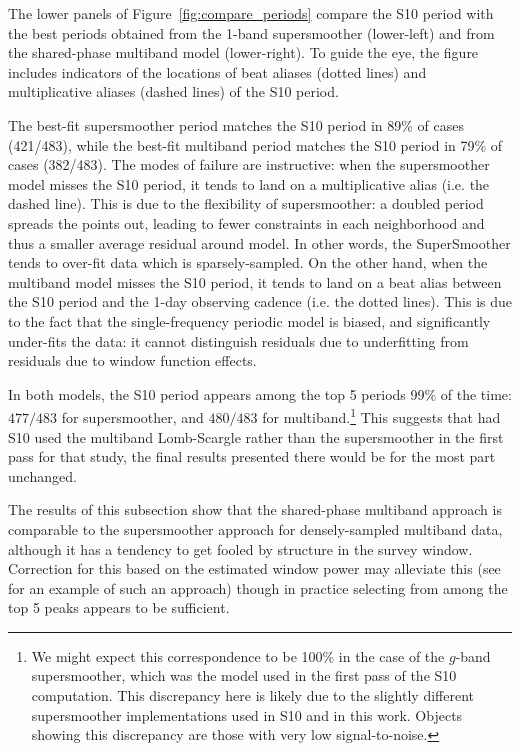 \documentclass{emulateapj}
\newcommand{\Fig}[1]{Figure~\ref{fig:#1}}
\newcommand{\fig}[1]{\Fig{#1}}
\begin{document}
The lower panels of \fig{compare_periods} compare the S10 period with the best periods obtained from the 1-band supersmoother (lower-left) and from the shared-phase multiband model (lower-right). To guide the eye, the figure includes indicators of the locations of beat aliases (dotted lines) and multiplicative aliases (dashed lines) of the S10 period.

The best-fit supersmoother period matches the S10 period in 89\% of cases (421/483), while the best-fit multiband period matches the S10 period in 79\% of cases (382/483). The modes of failure are instructive: when the supersmoother model misses the S10 period, it tends to land on a multiplicative alias (i.e. the dashed line). This is due to the flexibility of supersmoother: a doubled period spreads the points out, leading to fewer constraints in each neighborhood and thus a smaller average residual around model. In other words, the SuperSmoother tends to over-fit data which is sparsely-sampled. On the other hand, when the multiband model misses the S10 period, it tends to land on a beat alias between the S10 period and the 1-day observing cadence (i.e. the dotted lines). This is due to the fact that the single-frequency periodic model is biased, and significantly under-fits the data: it cannot distinguish residuals due to underfitting from residuals due to window function effects.

In both models, the S10 period appears among the top 5 periods 99\% of the time: $477/483$ for supersmoother, and $480/483$ for multiband.\footnote{We might expect this correspondence to be 100\% in the case of the $g$-band supersmoother, which was the model used in the first pass of the S10 computation. This discrepancy here is likely due to the slightly different supersmoother implementations used in S10 and in this work. Objects showing this discrepancy are those with very low signal-to-noise.} This suggests that had S10 used the multiband Lomb-Scargle rather than the supersmoother in the first pass for that study, the final results presented there would be for the most part unchanged.

The results of this subsection show that the shared-phase multiband approach is comparable to the supersmoother approach for densely-sampled multiband data, although it has a tendency to get fooled by structure in the survey window. Correction for this based on the estimated window power may alleviate this (see \citet{Roberts87} for an example of such an approach) though in practice selecting from among the top 5 peaks appears to be sufficient.
\end{document}

